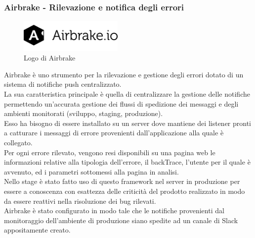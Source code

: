 \subsubsection{Airbrake - Rilevazione e notifica degli errori}

\begin{figure}[htbp]
	\begin{center}
		\includegraphics[height=1.6cm]{Pics/airbrake_logo.png}
		\caption{Logo di Airbrake}
	\end{center}
\end{figure}
Airbrake è uno strumento per la rilevazione e gestione degli errori dotato di un sistema di notifiche push centralizzato. \\
La sua caratteristica principale è quella di centralizzare la gestione delle notifiche permettendo un'accurata gestione dei flussi di spedizione dei messaggi e degli ambienti monitorati (sviluppo, staging, produzione). \\ 
Esso ha bisogno di essere installato su un server dove mantiene dei listener pronti a catturare i messaggi di errore provenienti dall'applicazione alla quale è collegato.\\
Per ogni errore rilevato, vengono resi disponibili su una pagina web le informazioni relative alla tipologia dell'errore, il backTrace, l'utente per il quale è avvenuto, ed i parametri sottomessi alla pagina in analisi.\\
Nello stage è stato fatto uso di questo framework nel server in produzione per essere a conoscenza con esattezza delle criticità del prodotto realizzato in modo da essere reattivi nella risoluzione dei bug rilevati.\\
Airbrake è stato configurato in modo tale che le notifiche provenienti dal monitoraggio dell'ambiente di produzione siano spedite ad un canale di Slack appositamente creato.


\cleardoublepage
